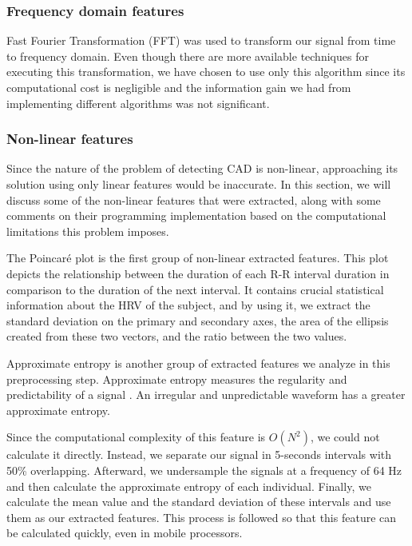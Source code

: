 \subsubsection{Frequency domain features}
\label{sssec:frequency_domain_features}
Fast Fourier Transformation (FFT) was used to transform our signal from time to frequency domain. Even though there are more available techniques for executing this transformation, we have chosen to use only this algorithm since its computational cost is negligible and the information gain we had from implementing different algorithms was not significant.
%
\subsubsection{Non-linear features}
\label{sssec:non-linear_features}
Since the nature of the problem of detecting CAD is non-linear, approaching its solution using only linear features would be inaccurate. In this section, we will discuss some of the non-linear features that were extracted, along with some comments on their programming implementation based on the computational limitations this problem imposes.

The Poincaré plot \cite{poincare} is the first group of non-linear extracted features. This plot depicts the relationship between the duration of each R-R interval duration in comparison to the duration of the next interval. It contains crucial statistical information about the HRV of the subject, and by using it, we extract the standard deviation on the primary and secondary axes, the area of the ellipsis created from these two vectors, and the ratio between the two values.

Approximate entropy is another group of extracted features we analyze in this preprocessing step. Approximate entropy measures the regularity and predictability of a signal \cite{appEn_article}. An irregular and unpredictable waveform has a greater approximate entropy. 

Since the computational complexity of this feature is $O(N^2)$, we could not calculate it directly. Instead, we separate our signal in 5-seconds intervals with 50\% overlapping. Afterward, we undersample the signals at a frequency of 64 Hz and then calculate the approximate entropy of each individual. Finally, we calculate the mean value and the standard deviation of these intervals and use them as our extracted features. This process is followed so that this feature can be calculated quickly, even in mobile processors.

